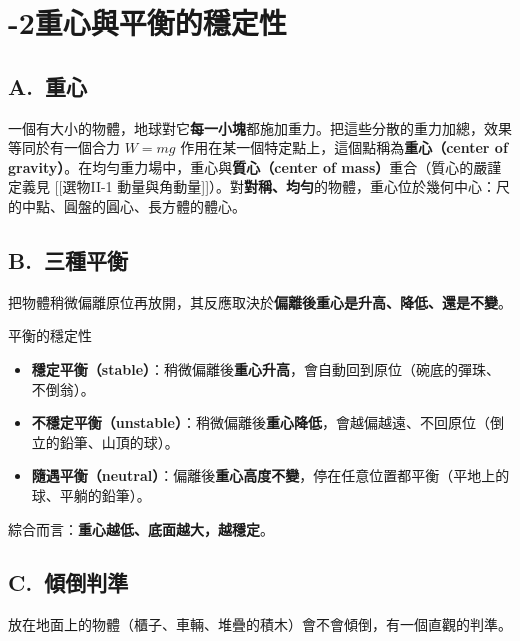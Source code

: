 \documentclass[11pt]{article}
\begin{document}
\section*{-2\quad 重心與平衡的穩定性}

\subsection*{\sffamily A.\ 重心}

一個有大小的物體，地球對它\textbf{每一小塊}都施加重力。把這些分散的重力加總，效果等同於有一個合力 $W=mg$ 作用在某一個特定點上，這個點稱為\textbf{重心（center of gravity）}。在均勻重力場中，重心與\textbf{質心（center of mass）}重合（質心的嚴謹定義見 [[選物II-1 動量與角動量]]）。對\textbf{對稱、均勻}的物體，重心位於幾何中心：尺的中點、圓盤的圓心、長方體的體心。

\subsection*{\sffamily B.\ 三種平衡}

把物體稍微偏離原位再放開，其反應取決於\textbf{偏離後重心是升高、降低、還是不變}。

\begin{補充框}{平衡的穩定性}
\begin{itemize}\setlength{\itemsep}{1pt}
\item \textbf{穩定平衡（stable）}：稍微偏離後\textbf{重心升高}，會自動回到原位（碗底的彈珠、不倒翁）。
\item \textbf{不穩定平衡（unstable）}：稍微偏離後\textbf{重心降低}，會越偏越遠、不回原位（倒立的鉛筆、山頂的球）。
\item \textbf{隨遇平衡（neutral）}：偏離後\textbf{重心高度不變}，停在任意位置都平衡（平地上的球、平躺的鉛筆）。
\end{itemize}
綜合而言：\textbf{重心越低、底面越大，越穩定}。
\end{補充框}

\subsection*{\sffamily C.\ 傾倒判準}

放在地面上的物體（櫃子、車輛、堆疊的積木）會不會傾倒，有一個直觀的判準。
\end{document}
